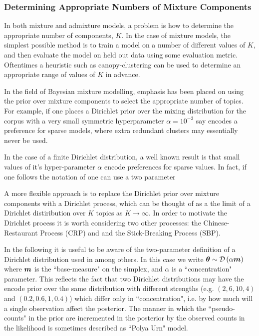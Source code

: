 

\subsubsection{Determining Appropriate Numbers of Mixture Components}
In both mixture and admixture models, a problem is how to determine the appropriate number of components, $K$. In the case of mixture models, the simplest possible method is to train a model on a number of different values of $K$, and then evaluate the model on held out data using some evaluation metric. Oftentimes a heuristic such as canopy-clustering\cite{McCallum2000} can be used to determine an appropriate range of values of $K$ in advance.

In the field of Bayesian mixture modelling, emphasis has been placed on using the prior over mixture components to select the appropriate number of topics. For example, if one places a Dirichlet prior over the mixing distribution for the corpus with a very small symmetric hyperparameter $\alpha = 10^{-3}$ say encodes a preference for sparse models, where extra redundant clusters may essentially never be used. 


In the case of a finite Dirichlet distribution, a well known result is that small values of it's hyper-parameter $\alpha$ encode preferences for sparse values. In fact, if one follows the notation of  one can use a two parameter


A more flexible approach is to replace the Dirichlet prior over mixture components with a Dirichlet process, which can be thought of as a the limit of a Dirichlet distiribution over $K$ topics as $K \rightarrow \infty$. In order to motivate the Dirichlet process it is worth considering two other processes: the Chinese-Restaurant Process (CRP) and and the Stick-Breaking Process (SBP).

In the following it is useful to be aware of the two-parameter definition of a Dirichlet distribution used in \cite{MacKay1995}\cite{Wallach2006}\cite{Wallach2009a} among others. In this case we write $\bm \theta \sim \mathcal{D} \left( {\alpha \bm m} \right)$ where $\bm m$ is the ``base-measure" on the simplex, and $\alpha$ is a ``concentration" parameter. This reflects the fact that two Dirichlet distributions may have the encode prior over the same distribution with different strengths (e.g. $(2, 6, 10, 4)$ and $(0.2, 0.6, 1, 0.4)$) which differ only in ``concentration", i.e. by how much will a single observation affect the posterior. The manner in which the ``pseudo-counts" in the prior are incremented in the posterior by the observed counts in the likelihood is sometimes described as ``Polya Urn" model.

